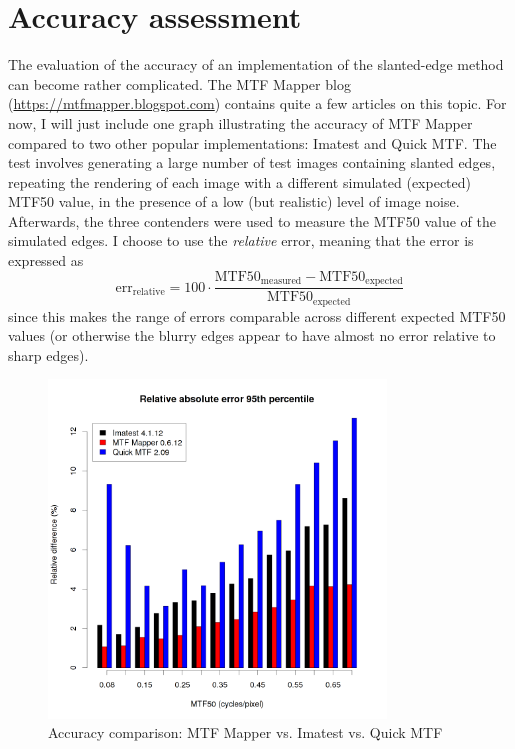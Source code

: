 \documentclass[a4paper]{article}
\begin{document}
\newpage

\section{Accuracy assessment}
\label{sec:accuracy}
The evaluation of the accuracy of an implementation of the slanted-edge
method can become rather complicated. The MTF Mapper blog
(\url{https://mtfmapper.blogspot.com}) contains quite a few articles on this
topic. For now, I will just include one graph illustrating the accuracy of
MTF Mapper compared to two other popular implementations: Imatest and
Quick MTF. The test involves generating a large number of test images
containing slanted edges, repeating the rendering of each image with a
different simulated (expected) MTF50 value, in the presence of a low (but
realistic) level of image noise. Afterwards, the three contenders were used
to measure the MTF50 value of the simulated edges. I choose to use the
\emph{relative} error, meaning that the error is expressed as
\begin{displaymath}
\mathrm{err}_\mathrm{relative} = 
100\cdot\frac{\mathrm{MTF50}_\mathrm{measured} -\mathrm{MTF50}_\mathrm{expected}}{\mathrm{MTF50}_\mathrm{expected}}
\end{displaymath}
since this makes the range of errors comparable across different expected
MTF50 values (or otherwise the blurry edges appear to have almost no error
relative to sharp edges).

\begin{figure}[ht!]
\centering
\includegraphics[width=0.8\textwidth]{figures/p95_comparison}
\caption{Accuracy comparison: MTF Mapper vs. Imatest vs. Quick MTF}
\label{fig:se_comparison}
\end{figure}
\end{document}
